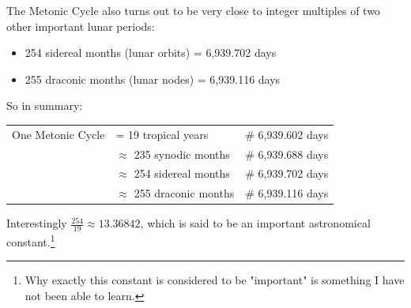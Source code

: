 \documentclass[11pt, oneside]{article}   	%
\theoremstyle{definition}
\begin{document}
\bigskip
\noindent
The Metonic Cycle also turns out to be very close to integer multiples of two other important lunar periods:

\bigskip
\begin{itemize}
  \item 254 sidereal months (lunar orbits) = 6,939.702 days
  \item 255 draconic months (lunar nodes) = 6,939.116 days
\end{itemize}

\bigskip
\noindent
So in  summary: 

\begin{flushleft}
\begin{tabular}{@{}l@{\ }l@{\qquad}l}
  One Metonic Cycle
  & = 19 tropical years                            & \# 6,939.602 days \\
  & $\approx$ 235 synodic months        & \# 6,939.688 days \\
  & $\approx$ 254 sidereal months        & \# 6,939.702 days \\
  & $\approx$ 255 draconic months       & \# 6,939.116 days \\
\end{tabular}
\end{flushleft}




\bigskip
\noindent
Interestingly $\frac{254}{19} \approx 13.36842$,  which is said to be an important astronomical constant.\footnote{Why exactly this 
constant is considered to be "important" is something I have not been able to learn.}
\end{document}
